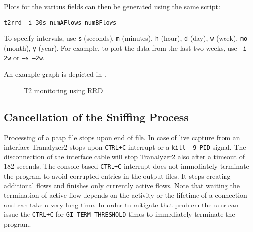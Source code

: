 Plots for the various fields can then be generated using the same  script:

\begin{center}
    {\tt t2rrd -i 30s numAFlows numBFlows}
\end{center}

To specify intervals, use {\tt s} (seconds), {\tt m} (minutes), {\tt h} (hour), {\tt d} (day), {\tt w} (week), {\tt mo} (month), {\tt y} (year).
For example, to plot the data from the last two weeks, use {\tt --i 2w} or {\tt --s --2w}.

An example graph is depicted in .

\begin{figure}[!ht]
    \centering
    \caption{T2 monitoring using RRD}
    \label{fig:rrdplot}
\end{figure}

\subsection{Cancellation of the Sniffing Process}
Processing of a pcap file stops upon end of file. In case of live capture from an interface Tranalyzer2 stops upon {\tt CTRL+C} interrupt or a {\tt kill --9 PID} signal. The disconnection of the interface cable will stop Tranalyzer2 also after a timeout of 182 seconds. The console based {\tt CTRL+C} interrupt does not immediately terminate the program to avoid corrupted entries in the output files. It stops creating additional flows and finishes only currently active flows. Note that waiting the termination of active flow depends on the activity or the lifetime of a connection and can take a very long time. In order to mitigate that problem the user can issue the {\tt CTRL+C} for {\tt GI\_TERM\_THRESHOLD} times to immediately terminate the program.
